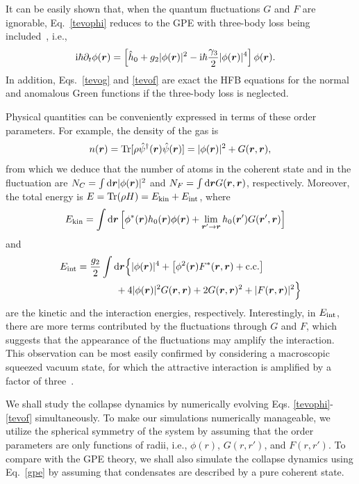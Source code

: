 \documentclass[pra,twocolumn,preprintnumbers,superscriptaddress,longbibliography,showkeys]{revtex4-1}
\begin{document}
It can be easily shown that, when the quantum fluctuations $G$ and $F$ are ignorable, Eq.~\eqref{tevophi} reduces to the GPE with three-body loss being included~\cite{3BlGPE}, i.e.,
\begin{align}
{\rm i} \hbar \partial_{t} \phi({\bm r}) & = \left[\hat h_{0} + g_{2} \vert \phi({\bm r}) \vert^{2}-{\rm i} \hbar \frac{\gamma_{3}}{2} \vert \phi({\bm r}) \vert^{4}\right] \phi({\bm r}).\label{gpe}
\end{align}
In addition, Eqs.~\eqref{tevog} and \eqref{tevof} are exact the HFB equations for the normal and anomalous Green functions if the three-body loss is neglected.

Physical quantities can be conveniently expressed in terms of these order parameters. For example, the density of the gas is
\begin{align}
	n({\bm r}) = {\rm Tr}[\rho \hat{\psi}^{\dagger}({\bm r}) \hat{\psi}({\bm r})] = |\phi({\bm r})|^2+ G({\bm r}, {\bm r}),
\end{align}
from which we deduce that the number of atoms in the coherent state and in the fluctuation are $N_C=\int {\rm d}{\bm r}|\phi({\bm r})|^2$ and $N_F=\int {\rm d}{\bm r}G({\bm r},{\bm r})$, respectively.
Moreover, the total energy is $E = {\rm Tr}(\rho H) = E_{\rm kin} + E_{\rm int}$, where
\begin{align}
	E_{\rm kin} &= \int {\rm d}{\bm r} \left[ \phi^{\ast}({\bm r}) h_{0}({\bm r}) \phi({\bm r}) + \lim_{{\bm r}' \rightarrow {\bm r}} h_{0}({\bm r}') G({\bm r}', {\bm r}) \right] \label{engkin}
\end{align}
and
\begin{align}
	E_{\rm int} &= \frac{g_{2}}{2} \int {\rm d}{\bm r} \Big\{ \vert \phi({\bm r}) \vert^{4} + \left[ \phi^{2}({\bm r}) F^{\ast}({\bm r}, {\bm r}) + {\rm c.c.} \right]\nonumber\\
	&\qquad\qquad+ 4 \vert \phi({\bm r}) \vert^{2} G({\bm r}, {\bm r}) + 2 G({\bm r}, {\bm r})^{2} + \vert F({\bm r}, {\bm r}) \vert^{2} \Big\}\label{engint}
\end{align}
are the kinetic and the interaction energies, respectively. Interestingly, in $E_{\rm int}$, there are more terms contributed by the fluctuations through $G$ and $F$, which suggests that the appearance of the fluctuations may amplify the interaction. This observation can be most easily confirmed by considering a macroscopic squeezed vacuum state, for which the attractive interaction is amplified by a factor of three~\cite{Shi2019}.

We shall study the collapse dynamics by numerically evolving Eqs. \eqref{tevophi}-\eqref{tevof} simultaneously. To make our simulations numerically manageable, we utilize the spherical symmetry of the system by assuming that the order parameters are only functions of radii, i.e., $\phi(r)$, $G(r,r')$, and $F(r,r')$. To compare with the GPE theory, we shall also simulate the collapse dynamics using Eq.~\eqref{gpe} by assuming that condensates are described by a pure coherent state.
\end{document}
